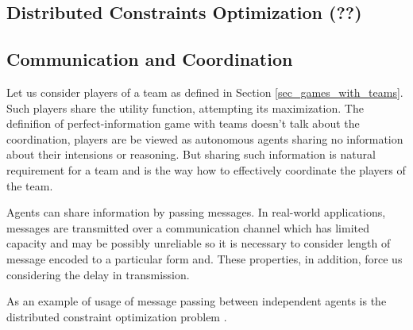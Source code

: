 \subsection{Distributed Constraints Optimization (??)}


\subsection{Communication and Coordination}

Let us consider players of a team as defined in Section \ref{sec_games_with_teams}. Such
players share the utility function, attempting its maximization. The definifion of
perfect-information game with teams doesn't talk about the coordination, players are be viewed
as autonomous agents sharing no information about their intensions or reasoning. But sharing
such information is natural requirement for a team and is the way how to effectively coordinate
the players of the team.

Agents can share information by passing messages. In real-world applications, messages are
transmitted over a communication channel which has limited capacity and may be possibly
unreliable so it is necessary to consider length of message encoded to a particular form and.
These properties, in addition, force us considering the delay in transmission.

As an example of usage of message passing between independent agents is the distributed
constraint optimization problem \cite{Zivan2009}.

